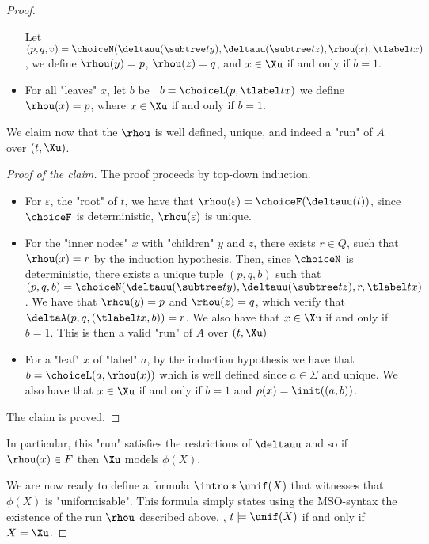 \documentclass[a4paper,UKenglish,cleveref, autoref, thm-restate]{lipics-v2021}
\begin{document}
\begin{proof}
\begin{itemize}
            Let $(p,q,v) = \choiceN(\deltauu(\subtree t y), \deltauu(\subtree t z), \rhou(x), \tlabel t x)$, we define $\rhou(y)=p$, $\rhou(z)=q$, and $x \in \Xu$ if and only if $b = 1$.
		\item For all "leaves" $x$, let $b$ be ~$b = \choiceL(p, \tlabel t x)$ we define $\rhou (x) = p$, where $x \in \Xu$ if and only if $b = 1$.
	\end{itemize}

    \begin{claim}
	We claim now that the $\rhou$ is well defined, unique, and indeed a "run" of $A$ over $(t,\Xu)$. 
    \end{claim}

    \begin{proof}[Proof of the claim]
    The proof proceeds by top-down induction.
	\begin{itemize}
		\item For $\varepsilon$, the "root" of $t$, we have that $\rhou(\varepsilon) = \choiceF(\deltauu(t))$, since $\choiceF$ is deterministic, $\rhou(\varepsilon)$ is unique.
		\item For the "inner nodes" $x$ with "children" $y$ and $z$, there exists $r \in Q$, such that $\rhou (x) = r$ by the induction hypothesis. Then,
		      since $\choiceN$ is deterministic, there exists a unique tuple $(p,q,b)$ such that $(p,q,b) = \choiceN(\deltauu(\subtree t y), \deltauu(\subtree t z), r, \tlabel t x)$.
		      We have that $\rhou(y) = p$ and $\rhou(z) = q$, which verify that $\deltaA(p,q,(\tlabel t x,b)) = r$. We also have that $x \in \Xu$ if and only if $b = 1$.
		      This is then a valid "run" of $A$ over $(t,\Xu)$
		\item For a "leaf" $x$ of "label" $a$, by the induction hypothesis we have that $b = \choiceL(a, \rhou(x))$ which is well defined since $a \in \Sigma$ and unique.
		      We also have that $x \in \Xu$ if and only if $b = 1$ and $\rho(x) = \init((a,b))$.
	\end{itemize}
	The claim is proved.
    \end{proof}

    In particular, this "run" satisfies the restrictions of $\deltauu$ and so if $\rhou(x) \in F$ then $\Xu$ models $\phi(X)$.

	\AP We are now ready to define a formula $\intro*\unif (X)$ that witnesses that $\phi(X)$ is "uniformisable".
	This formula simply states using the MSO-syntax the existence of the run $\rhou$ described above, \ie,
    $t \models \unif(X)$ if and only if $X=\Xu$.


\end{proof}
\end{document}
